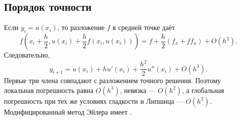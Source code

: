 \documentclass[../final.tex]{subfiles}
\begin{document}
\subsection{Порядок точности}

Если $y_i=u(x_i)$, то разложение $f$ в средней точке даёт
\begin{equation*}
    f\!\left(x_i+\frac h2,u(x_i)+\frac h2f(x_i,u(x_i))\right)
    =f+\frac h2(f_x+ff_u)+O(h^2).
\end{equation*}
Следовательно,
\begin{equation*}
    y_{i+1}=u(x_i)+hu'(x_i)+\frac{h^2}{2}u''(x_i)+O(h^3).
\end{equation*}
Первые три члена совпадают с разложением точного решения.
Поэтому локальная погрешность равна $O(h^3)$, невязка --- $O(h^2)$,
а глобальная погрешность при тех же условиях гладкости и Липшица --- $O(h^2)$.
Модифицированный метод Эйлера имеет .
\end{document}
